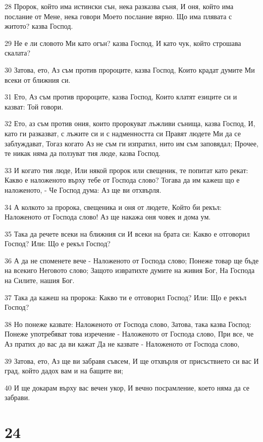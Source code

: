 \par 28 Пророк, който има истински сън, нека разказва съня, И оня, който има послание от Мене, нека говори Моето послание вярно. Що има плявата с житото? казва Господ.
\par 29 Не е ли словото Ми като огън? казва Господ, И като чук, който строшава скалата?
\par 30 Затова, ето, Аз съм против пророците, казва Господ, Които крадат думите Ми всеки от ближния си.
\par 31 Ето, Аз съм против пророците, казва Господ, Които клатят езиците си и казват: Той говори.
\par 32 Ето, аз съм против ония, които пророкуват лъжливи сънища, казва Господ, И, като ги разказват, с лъжите си и с надменността си Правят людете Ми да се заблуждават, Тогаз когато Аз не съм ги изпратил, нито им съм заповядал; Прочее, те никак няма да ползуват тия люде, казва Господ.
\par 33 И когато тия люде, Или някой пророк или свещеник, те попитат като рекат: Какво е наложеното върху тебе от Господа слово? Тогава да им кажеш що е наложеното, - Че Господ дума: Аз ще ви отхвърля.
\par 34 А колкото за пророка, свещеника и оня от людете, Който би рекъл: Наложеното от Господа слово! Аз ще накажа оня човек и дома ум.
\par 35 Така да речете всеки на ближния си И всеки на брата си: Какво е отговорил Господ? Или: Що е рекъл Господ?
\par 36 А да не споменете вече - Наложеното от Господа слово; Понеже товар ще бъде на всекиго Неговото слово; Защото извратихте думите на живия Бог, На Господа на Силите, нашия Бог.
\par 37 Така да кажеш на пророка: Какво ти е отговорил Господ? Или: Що е рекъл Господ?
\par 38 Но понеже казвате: Наложеното от Господа слово, Затова, така казва Господ: Понеже употребяват това изречение - Наложеното от Господа слово, При все, че Аз пратих до вас да ви кажат Да не казвате - Наложеното от Господа слово,
\par 39 Затова, ето, Аз ще ви забравя съвсем, И ще отхвърля от присъствието си вас И град, който дадох вам и на бащите ви;
\par 40 И ще докарам върху вас вечен укор, И вечно посрамление, което няма да се забрави.

\chapter{24}

